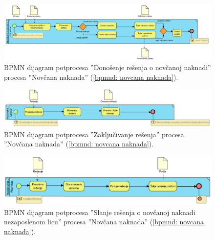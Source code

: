 \begin{mylandscape}
	\newpage
	
	\begin{figure}[H]
		\centering
		\includegraphics[width=0.6\paperwidth]{dijagrami/bpmn-dijagrami/bpmn-4.png}
		\caption{BPMN dijagram potprocesa ''Dono\v senje re\v senja o nov\v canoj naknadi'' procesa ''Nov\v cana naknada'' (\ref{bpmnd: novcana naknada}).}
	\end{figure}
	
	\begin{figure}[H]
		\centering
		\includegraphics[width=0.6\paperwidth]{dijagrami/bpmn-dijagrami/bpmn-5.png}
		\caption{BPMN dijagram potprocesa ''Zaklju\v civanje re\v senja'' procesa ''Nov\v cana naknada'' (\ref{bpmnd: novcana naknada}).}
	\end{figure}

	\newpage
	
	\begin{figure}[H]
		\centering
		\includegraphics[width=0.6\paperwidth]{dijagrami/bpmn-dijagrami/bpmn-6.png}
		\caption{BPMN dijagram potprocesa ''Slanje re\v senja o nov\v canoj naknadi nezaposlenom licu'' procesa ''Nov\v cana naknada'' (\ref{bpmnd: novcana naknada}).}
	\end{figure}


\end{mylandscape}
